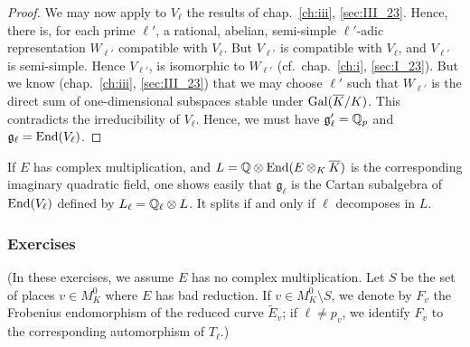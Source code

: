 \begin{proof}
	We may now apply to $V_\ell$ the results of chap.~\ref{ch:iii},
	\ref{sec:III_23}.  Hence, there is, for each prime $\ell'$, a rational,
	abelian, semi-simple $\ell'$-adic representation $W_{\ell'}$ compatible
	with $V_\ell$. But $V_{\ell'}$ is compatible with $V_\ell$, and
	$V_{\ell'}$ is semi-simple. Hence $V_{\ell'}$, is isomorphic to
	$W_{\ell'}$ (cf.\ chap.~\ref{ch:i}, \ref{sec:I_23}). But we know
	(chap.~\ref{ch:iii}, \ref{sec:III_23}) that we may choose $\ell'$ such
	\dpage
	that $W_{\ell'}$ is the direct sum of one-dimensional subspaces stable
	under $\operatorname{Gal}(\overline{K}/K)$. This contradicts the irreducibility of
	$V_\ell$. Hence, we must have $\mathfrak{g}_\ell^\prime = \mathbb{Q}_p$ and
	$\mathfrak{g}_\ell = \operatorname{End}(V_\ell)$.
\end{proof}

\begin{obs}
	If $E$ has complex multiplication, and $L = \mathbb{Q} \otimes \operatorname{End}(E \otimes_K
	\overline{K})$ is the corresponding imaginary quadratic field, one shows
	easily that $\mathfrak{g}_\ell$ is the Cartan subalgebra of
	$\operatorname{End}(V_\ell)$ defined by $L_\ell = \mathbb{Q}_\ell \otimes L$. It splits if and
	only if $\ell$ decomposes in $L$.
\end{obs}

\subsubsection*{Exercises}
(In these exercises, we assume $E$ has no complex multiplication. Let $S$ be
the set of places $v \in M_K^0$ where $E$ has bad reduction. If $v \in M_K^0
\setminus S$, we denote by $F_v$ the Frobenius endomorphism of the reduced
curve $\widetilde{E}_v$; if $\ell \ne p_v$, we identify $F_v$ to the
corresponding automorphism of $T_\ell$.)

